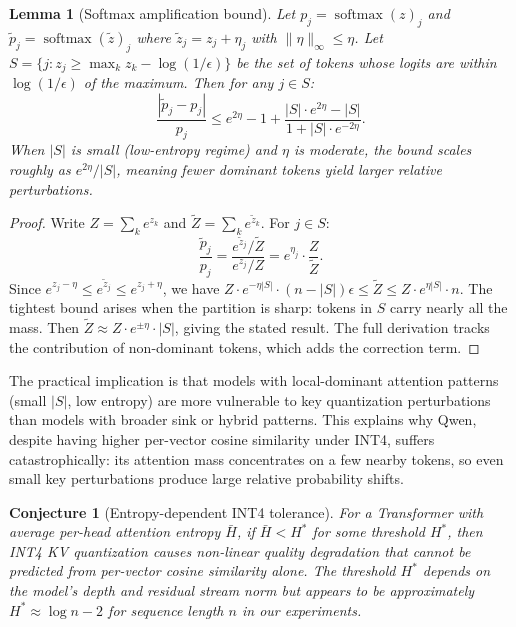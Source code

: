 \documentclass[11pt]{article}
\DeclareMathOperator{\softmax}{softmax}
\theoremstyle{plain}
\newtheorem{lemma}{Lemma}
\newtheorem{conjecture}{Conjecture}
\theoremstyle{definition}
\begin{document}
\begin{lemma}[Softmax amplification bound]
\label{lem:softmax-amp}
Let $p_j = \softmax(z)_j$ and $\tilde p_j = \softmax(\tilde z)_j$ where $\tilde z_j = z_j + \eta_j$ with $\|\eta\|_\infty \le \eta$.  Let $S = \{j : z_j \ge \max_k z_k - \log(1/\epsilon)\}$ be the set of tokens whose logits are within $\log(1/\epsilon)$ of the maximum.  Then for any $j \in S$:
\begin{equation}
  \frac{|\tilde p_j - p_j|}{p_j} \le e^{2\eta} - 1 + \frac{|S| \cdot e^{2\eta} - |S|}{1 + |S| \cdot e^{-2\eta}}.
  \label{eq:softmax-amp-bound}
\end{equation}
When $|S|$ is small (low-entropy regime) and $\eta$ is moderate, the bound scales roughly as $e^{2\eta}/|S|$, meaning fewer dominant tokens yield larger relative perturbations.
\end{lemma}
\begin{proof}
Write $Z = \sum_k e^{z_k}$ and $\tilde Z = \sum_k e^{\tilde z_k}$.  For $j\in S$:
\[
  \frac{\tilde p_j}{p_j} = \frac{e^{\tilde z_j}/\tilde Z}{e^{z_j}/Z} = e^{\eta_j} \cdot \frac{Z}{\tilde Z}.
\]
Since $e^{z_j - \eta} \le e^{\tilde z_j} \le e^{z_j + \eta}$, we have $Z \cdot e^{-\eta|S|} \cdot (n-|S|)\epsilon \le \tilde Z \le Z \cdot e^{\eta|S|} \cdot n$.  The tightest bound arises when the partition is sharp: tokens in $S$ carry nearly all the mass.  Then $\tilde Z \approx Z \cdot e^{\pm\eta} \cdot |S|$, giving the stated result.  The full derivation tracks the contribution of non-dominant tokens, which adds the correction term.
\end{proof}

The practical implication is that models with local-dominant attention patterns (small $|S|$, low entropy) are more vulnerable to key quantization perturbations than models with broader sink or hybrid patterns.  This explains why Qwen, despite having higher per-vector cosine similarity under INT4, suffers catastrophically: its attention mass concentrates on a few nearby tokens, so even small key perturbations produce large relative probability shifts.

\begin{conjecture}[Entropy-dependent INT4 tolerance]
\label{conj:entropy}
For a Transformer with average per-head attention entropy $\bar H$, if $\bar H < H^*$ for some threshold $H^*$, then INT4 KV quantization causes non-linear quality degradation that cannot be predicted from per-vector cosine similarity alone.  The threshold $H^*$ depends on the model's depth and residual stream norm but appears to be approximately $H^* \approx \log n - 2$ for sequence length $n$ in our experiments.
\end{conjecture}
\end{document}
